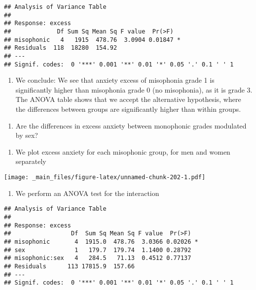\documentclass[
]{book}
\providecommand{\tightlist}{%
  \setlength{\itemsep}{0pt}\setlength{\parskip}{0pt}}
\begin{document}
\begin{verbatim}
## Analysis of Variance Table
## 
## Response: excess
##             Df Sum Sq Mean Sq F value  Pr(>F)  
## misophonic   4   1915  478.76  3.0904 0.01847 *
## Residuals  118  18280  154.92                  
## ---
## Signif. codes:  0 '***' 0.001 '**' 0.01 '*' 0.05 '.' 0.1 ' ' 1
\end{verbatim}

\begin{enumerate}
\def\labelenumi{\alph{enumi}.}
\setcounter{enumi}{2}
\tightlist
\item
  We conclude: We see that anxiety excess of misophonia grade 1 is significantly higher than misophonia grade 0 (no misophonia), as it is grade 3. The ANOVA table shows that we accept the alternative hypothesis, where the differences between groups are significantly higher than within groups.
\end{enumerate}

\begin{enumerate}
\def\labelenumi{\arabic{enumi}.}
\setcounter{enumi}{5}
\tightlist
\item
  Are the differences in excess anxiety between monophonic grades modulated by sex?
\end{enumerate}

\begin{enumerate}
\def\labelenumi{\alph{enumi}.}
\tightlist
\item
  We plot excess anxiety for each misophonic group, for men and women separately
\end{enumerate}

\texttt{[image: \_main\_files/figure-latex/unnamed-chunk-202-1.pdf]}

\begin{enumerate}
\def\labelenumi{\alph{enumi}.}
\setcounter{enumi}{1}
\tightlist
\item
  We perform an ANOVA test for the interaction
\end{enumerate}

\begin{verbatim}
## Analysis of Variance Table
## 
## Response: excess
##                 Df  Sum Sq Mean Sq F value  Pr(>F)  
## misophonic       4  1915.0  478.76  3.0366 0.02026 *
## sex              1   179.7  179.74  1.1400 0.28792  
## misophonic:sex   4   284.5   71.13  0.4512 0.77137  
## Residuals      113 17815.9  157.66                  
## ---
## Signif. codes:  0 '***' 0.001 '**' 0.01 '*' 0.05 '.' 0.1 ' ' 1
\end{verbatim}
\end{document}
